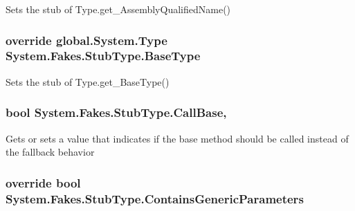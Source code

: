 Sets the stub of Type.\-get\-\_\-\-Assembly\-Qualified\-Name()

\hypertarget{class_system_1_1_fakes_1_1_stub_type_a0238e52b70709094484e3e4c1d68cecc}{
\subsubsection[{Base\-Type}]{\setlength{\rightskip}{0pt plus 5cm}override global.\-System.\-Type System.\-Fakes.\-Stub\-Type.\-Base\-Type\hspace{0.3cm}{\ttfamily [get]}}}\label{class_system_1_1_fakes_1_1_stub_type_a0238e52b70709094484e3e4c1d68cecc}


Sets the stub of Type.\-get\-\_\-\-Base\-Type()

\hypertarget{class_system_1_1_fakes_1_1_stub_type_a83a300e21d728c882abb4ebf7dfa4caa}{
\subsubsection[{Call\-Base}]{\setlength{\rightskip}{0pt plus 5cm}bool System.\-Fakes.\-Stub\-Type.\-Call\-Base\hspace{0.3cm}{\ttfamily [get]}, {\ttfamily [set]}}}\label{class_system_1_1_fakes_1_1_stub_type_a83a300e21d728c882abb4ebf7dfa4caa}


Gets or sets a value that indicates if the base method should be called instead of the fallback behavior

\hypertarget{class_system_1_1_fakes_1_1_stub_type_a44b57a8b5fecb2e3f2d79b3c3bb72326}{
\subsubsection[{Contains\-Generic\-Parameters}]{\setlength{\rightskip}{0pt plus 5cm}override bool System.\-Fakes.\-Stub\-Type.\-Contains\-Generic\-Parameters\hspace{0.3cm}{\ttfamily [get]}}}\label{class_system_1_1_fakes_1_1_stub_type_a44b57a8b5fecb2e3f2d79b3c3bb72326}


